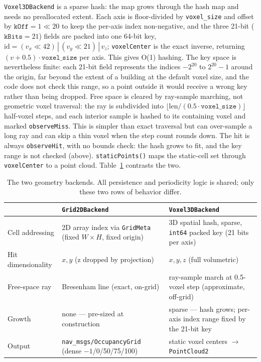 \documentclass[conference]{IEEEtran}
\begin{document}
\texttt{Voxel3DBackend} is a sparse hash: the map grows through the hash map and
needs no preallocated extent. Each
axis is floor-divided by \texttt{voxel\_size} and offset by $\texttt{kOff}=1\ll 20$ to
keep the per-axis index non-negative, and the three 21-bit
($\texttt{kBits}=21$) fields are packed into one 64-bit key,
$\text{id}=(v_x\ll 42)\,|\,(v_y\ll 21)\,|\,v_z$; \texttt{voxelCenter} is the exact
inverse, returning $(v+0.5)\cdot\texttt{voxel\_size}$ per axis. This gives O(1)
hashing. The key space is nevertheless finite: each 21-bit field represents the
indices $-2^{20}$ to $2^{20}-1$ around the origin, far beyond the extent of a
building at the default voxel size, and the code does not check this range, so
a point outside it would receive a wrong key rather than being dropped. Free space is
cleared by ray-sample marching, not geometric voxel traversal: the ray is
subdivided into $\lfloor\text{len}/(0.5\cdot\texttt{voxel\_size})\rfloor$
half-voxel steps, and each interior sample is hashed to its containing voxel and
marked \texttt{observeMiss}. This is simpler than exact traversal but can over-sample a
long ray and can skip a thin voxel when the step count rounds down. The hit is
always \texttt{observeHit}, with no bounds check: the hash grows to fit, and the
key range is not checked (above).
\texttt{staticPoints()} maps the static-cell set through \texttt{voxelCenter} to a point
cloud. Table~\ref{tbl:backends} contrasts the two.

\begin{table}[t]
\centering
\caption{The two geometry backends. All persistence and periodicity logic is shared; only these two rows of behavior differ.}
\label{tbl:backends}
\begin{tabular}{@{}lll@{}}
\toprule
 & \texttt{Grid2DBackend} & \texttt{Voxel3DBackend} \\
\midrule
Cell addressing & 2D array index via \texttt{GridMeta} (fixed $W\times H$, fixed origin) & 3D spatial hash, sparse, \texttt{int64} packed key (21 bits per axis) \\
Hit dimensionality & $x,y$ (z dropped by projection) & $x,y,z$ (full volumetric) \\
Free-space ray & Bresenham line (exact, on-grid) & ray-sample march at 0.5-voxel step (approximate, off-grid) \\
Growth & none --- pre-sized at construction & sparse --- hash grows; per-axis index range fixed by the 21-bit key \\
Output & \texttt{nav\_msgs/OccupancyGrid} (dense $-1$/0/50/75/100) & static voxel centers $\to$ \texttt{PointCloud2} \\
\bottomrule
\end{tabular}
\end{table}
\end{document}
